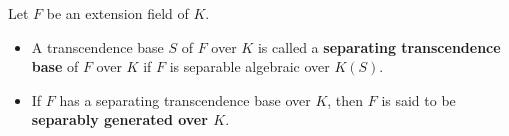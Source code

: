 Let $F$ be an extension field of $K$.
\begin{itemize}
\item A transcendence base $S$ of $F$ over $K$ is called a \textbf{separating transcendence base} of $F$ over $K$ if $F$ is separable algebraic over $K(S)$.
\item If $F$ has a separating transcendence base over $K$, then $F$ is said to be \textbf{separably generated over $K$}.
\end{itemize}
